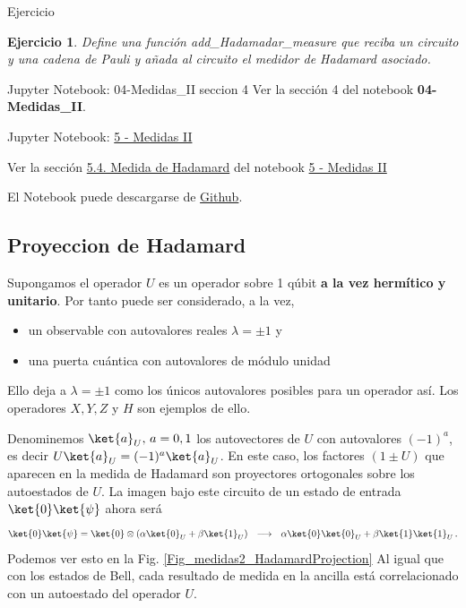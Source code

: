 \documentclass[a4paper,11pt]{book} %
\newtheorem{ejercicio_contador}{Ejercicio}
\newcommand{\Ejercicio}[1]{
		\begin{mybox_gray}{Ejercicio} 
			\begin{ejercicio_contador}
				 #1 
			\end{ejercicio_contador} 
		\end{mybox_gray}
	}
\numberwithin{equation}{chapter}
\begin{document}
	\Ejercicio{
	Define una función add\_Hadamadar\_measure que reciba un circuito y una  cadena de Pauli y añada al 
	circuito el medidor de Hadamard asociado.
	}
	
	\begin{mybox_orange}{Jupyter Notebook: 04-Medidas\_II seccion 4}
	Ver la sección 4 del notebook \textbf{04-Medidas\_II}.
	\end{mybox_orange}


	\begin{mybox_orange}{Jupyter Notebook: \href{https://www.scbi.uma.es/web/wp-content/uploads/Jupyterbook/CICC_UMA/Notebooks/html/docs/Part_01/Chapter_05-Medidas_II_myst.html}{5 - Medidas II}}

	Ver la sección \href{https://www.scbi.uma.es/web/wp-content/uploads/Jupyterbook/CICC_UMA/Notebooks/html/docs/Part_01/Chapter_05-Medidas_II_myst.html#medida-de-hadamard}{5.4. Medida de Hadamard} del notebook \href{https://www.scbi.uma.es/web/wp-content/uploads/Jupyterbook/CICC_UMA/Notebooks/html/docs/Part_01/Chapter_05-Medidas_II_myst.html}{5 - Medidas II}
	
	El Notebook puede descargarse de \href{https://github.com/davidcb98/CICC_UMA/blob/master/Notebooks/Part_01/Chapter_05-Medidas_II.ipynb}{Github}.
	\end{mybox_orange}


        \subsection{Proyeccion de Hadamard}

Supongamos el operador $U$ es un operador sobre 1 qúbit \textbf{a la vez hermítico y unitario}. Por tanto puede ser considerado, a la vez, 
\begin{itemize}
	\item un observable con autovalores reales  $\lambda = \pm1$ y 
	\item una puerta cuántica con autovalores de módulo unidad
\end{itemize}
Ello deja a $\lambda = \pm 1$ como los únicos autovalores posibles para un operador así. Los operadores $X,Y,Z$ y $H$ son ejemplos de ello. 

Denominemos $\ket{a}_U, \, a=0,1$  los autovectores de $U$ con autovalores $(-1)^a$, es decir $U\ket{a}_U = (-1)^a\ket{a}_U$. En este caso, los factores $(1\pm U)$ que aparecen en la medida de Hadamard son proyectores ortogonales sobre los autoestados de $U$. La imagen bajo este circuito de un estado de entrada $\ket{0}\ket{\psi}$ ahora será
	\begin{equation}
	\ket{0}\ket{\psi} = \ket{0}\otimes (\alpha\ket{0}_U + \beta\ket{1}_U) ~~\longrightarrow ~~  \alpha\ket{0}\ket{0}_U +  \beta\ket{1}\ket{1}_U\, .
	\end{equation}
Podemos ver esto en la Fig. \ref{Fig_medidas2_HadamardProjection}  Al igual que con los estados de Bell, cada resultado de  medida en la ancilla está correlacionado con un autoestado del operador $U$.
\end{document}
